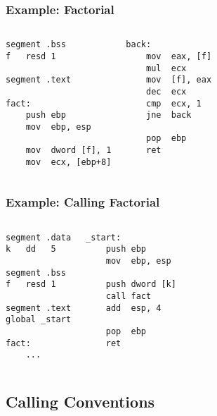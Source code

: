 \documentclass[dvipsnames]{beamer}
\begin{document}
\begin{frame}[fragile]
  \frametitle{Example: Factorial}

  \begin{columns}[t]
    \begin{lstlisting}
segment .bss
f   resd 1

segment .text

fact:
    push ebp
    mov  ebp, esp

    mov  dword [f], 1
    mov  ecx, [ebp+8]
    \end{lstlisting}

    \begin{lstlisting}
back:
    mov  eax, [f]
    mul  ecx
    mov  [f], eax
    dec  ecx
    cmp  ecx, 1
    jne  back

    pop  ebp
    ret
    \end{lstlisting}
  \end{columns}
\end{frame}

\begin{frame}[fragile]
  \frametitle{Example: Calling Factorial}

  \begin{columns}[t]
    \begin{lstlisting}
segment .data
k   dd   5

segment .bss
f   resd 1

segment .text
global _start

fact:
    ...
    \end{lstlisting}

    \begin{lstlisting}
_start:
    push ebp
    mov  ebp, esp

    push dword [k]
    call fact
    add  esp, 4

    pop  ebp
    ret
    \end{lstlisting}
  \end{columns}
\end{frame}

\subsection{Calling Conventions}
\end{document}
